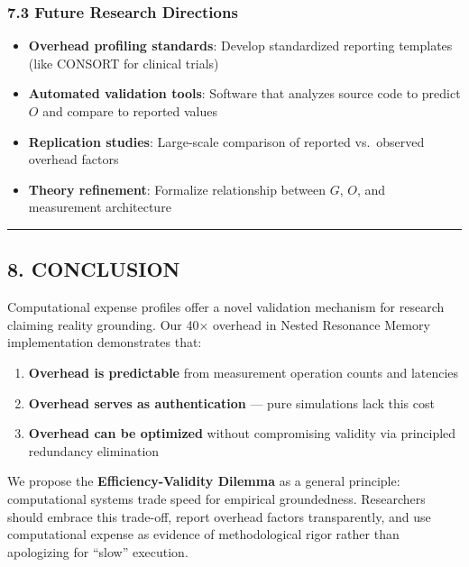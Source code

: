 \documentclass[
]{article}
\providecommand{\tightlist}{%
  \setlength{\itemsep}{0pt}\setlength{\parskip}{0pt}}
\begin{document}
\subsubsection{7.3 Future Research
Directions}\label{future-research-directions}

\begin{itemize}
\tightlist
\item
  \textbf{Overhead profiling standards}: Develop standardized reporting
  templates (like CONSORT for clinical trials)
\item
  \textbf{Automated validation tools}: Software that analyzes source
  code to predict \(O\) and compare to reported values
\item
  \textbf{Replication studies}: Large-scale comparison of reported
  vs.~observed overhead factors
\item
  \textbf{Theory refinement}: Formalize relationship between \(G\),
  \(O\), and measurement architecture
\end{itemize}

\begin{center}\rule{0.5\linewidth}{0.5pt}\end{center}

\subsection{8. CONCLUSION}\label{conclusion}

Computational expense profiles offer a novel validation mechanism for
research claiming reality grounding. Our 40× overhead in Nested
Resonance Memory implementation demonstrates that:

\begin{enumerate}
\def\labelenumi{\arabic{enumi}.}
\tightlist
\item
  \textbf{Overhead is predictable} from measurement operation counts and
  latencies
\item
  \textbf{Overhead serves as authentication} --- pure simulations lack
  this cost
\item
  \textbf{Overhead can be optimized} without compromising validity via
  principled redundancy elimination
\end{enumerate}

We propose the \textbf{Efficiency-Validity Dilemma} as a general
principle: computational systems trade speed for empirical groundedness.
Researchers should embrace this trade-off, report overhead factors
transparently, and use computational expense as evidence of
methodological rigor rather than apologizing for ``slow'' execution.
\end{document}

